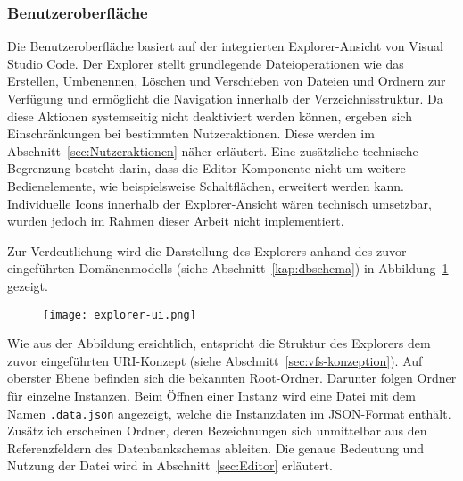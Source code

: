 
\subsubsection*{Benutzeroberfläche}
\label{par:uiExploerer}
Die Benutzeroberfläche basiert auf der integrierten Explorer-Ansicht von Visual Studio Code. Der Explorer stellt grundlegende Dateioperationen wie das Erstellen, Umbenennen, Löschen und Verschieben von Dateien und Ordnern zur Verfügung und ermöglicht die Navigation innerhalb der Verzeichnisstruktur. Da diese Aktionen systemseitig nicht deaktiviert werden können, ergeben sich Einschränkungen bei bestimmten Nutzeraktionen. Diese werden im Abschnitt~\ref{sec:Nutzeraktionen} näher erläutert. Eine zusätzliche technische Begrenzung besteht darin, dass die Editor-Komponente nicht um weitere Bedienelemente, wie beispielsweise Schaltflächen, erweitert werden kann. Individuelle Icons innerhalb der Explorer-Ansicht wären technisch umsetzbar, wurden jedoch im Rahmen dieser Arbeit nicht implementiert.

Zur Verdeutlichung wird die Darstellung des Explorers anhand des zuvor eingeführten Domänenmodells (siehe Abschnitt~\ref{kap:dbschema}) in Abbildung~\ref{fig:explorer-ui} gezeigt.

\begin{figure}[H]
  \centering
  \texttt{[image: explorer-ui.png]}
  \caption{}
  \label{fig:explorer-ui}
\end{figure}

Wie aus der Abbildung ersichtlich, entspricht die Struktur des Explorers dem zuvor eingeführten URI-Konzept (siehe Abschnitt~\ref{sec:vfs-konzeption}). Auf oberster Ebene befinden sich die bekannten Root-Ordner. Darunter folgen Ordner für einzelne Instanzen. Beim Öffnen einer Instanz wird eine Datei mit dem Namen \texttt{.data.json} angezeigt, welche die Instanzdaten im JSON-Format enthält. Zusätzlich erscheinen Ordner, deren Bezeichnungen sich unmittelbar aus den Referenzfeldern des Datenbankschemas ableiten. Die genaue Bedeutung und Nutzung der Datei wird in Abschnitt~\ref{sec:Editor} erläutert.

